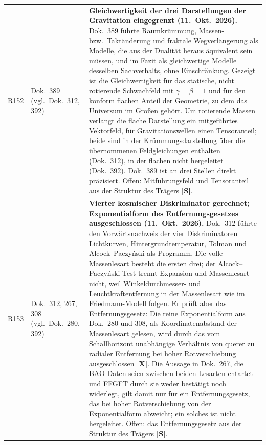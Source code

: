 \begin{longtable}{@{}p{0.9cm}p{3.1cm}p{10.2cm}@{}}
R152 & Dok.~389 (vgl.\ Dok.~312, 392) & \textbf{Gleichwertigkeit der drei Darstellungen der Gravitation eingegrenzt (11.~Okt.~2026).} Dok.~389 führte Raumkrümmung, Massen- bzw.\ Taktänderung und fraktale Wegverlängerung als Modelle, die aus der Dualität heraus äquivalent sein müssen, und im Fazit als gleichwertige Modelle desselben Sachverhalts, ohne Einschränkung. Gezeigt ist die Gleichwertigkeit für das statische, nicht rotierende Schwachfeld mit $\gamma=\beta=1$ und für den konform flachen Anteil der Geometrie, zu dem das Universum im Großen gehört. Um rotierende Massen verlangt die flache Darstellung ein mitgeführtes Vektorfeld, für Gravitationswellen einen Tensoranteil; beide sind in der Krümmungsdarstellung über die übernommenen Feldgleichungen enthalten (Dok.~312), in der flachen nicht hergeleitet (Dok.~392). Dok.~389 ist an drei Stellen direkt präzisiert. Offen: Mitführungsfeld und Tensoranteil aus der Struktur des Trägers \textbf{[S]}. \\
R153 & Dok.~312, 267, 308 (vgl.\ Dok.~280, 392) & \textbf{Vierter kosmischer Diskriminator gerechnet; Exponentialform des Entfernungsgesetzes ausgeschlossen (11.~Okt.~2026).} Dok.~312 führte den Vorwärtsnachweis der vier Diskriminatoren Lichtkurven, Hintergrundtemperatur, Tolman und Alcock--Paczyński als Programm. Die volle Massenlesart besteht die ersten drei; der Alcock--Paczyński-Test trennt Expansion und Massenlesart nicht, weil Winkeldurchmesser- und Leuchtkraftentfernung in der Massenlesart wie im Friedmann-Modell folgen. Er prüft aber das Entfernungsgesetz: Die reine Exponentialform aus Dok.~280 und 308, als Koordinatenabstand der Massenlesart gelesen, wird durch das vom Schallhorizont unabhängige Verhältnis von querer zu radialer Entfernung bei hoher Rotverschiebung ausgeschlossen \textbf{[X]}. Die Aussage in Dok.~267, die BAO-Daten seien zwischen beiden Lesarten entartet und FFGFT durch sie weder bestätigt noch widerlegt, gilt damit nur für ein Entfernungsgesetz, das bei hoher Rotverschiebung von der Exponentialform abweicht; ein solches ist nicht hergeleitet. Offen: das Entfernungsgesetz aus der Struktur des Trägers \textbf{[S]}. \\

\end{longtable}
